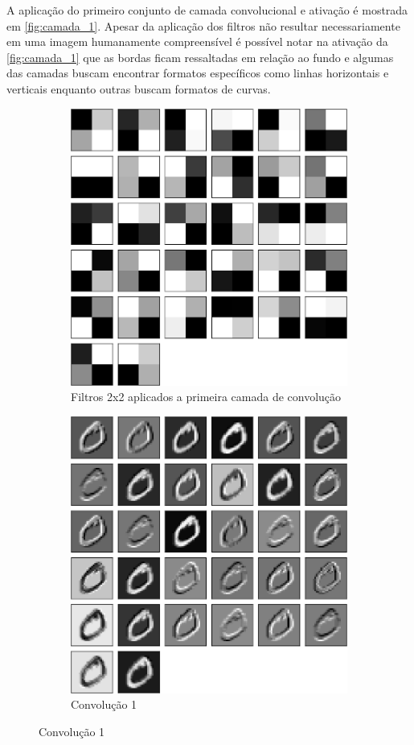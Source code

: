\documentclass[
	12pt,				%
	oneside,			%
	a4paper,			%
	english,			%
	french,				%
	spanish,			%
	brazil,				%
	]{abntex2}
\begin{document}
\par A aplicação do primeiro conjunto de camada convolucional e ativação é mostrada em \autoref{fig:camada_1}. Apesar da aplicação dos filtros não resultar necessariamente em uma imagem humanamente compreensível é possível notar na ativação da \ref{fig:camada_1} que as bordas ficam ressaltadas em relação ao fundo e algumas das camadas buscam encontrar formatos específicos como linhas horizontais e verticais enquanto outras buscam formatos de curvas. 

\begin{center}
\begin{figure}[H]
\centering
\begin{subfigure}{.8\textwidth}
\centering
\includegraphics[width=.6\linewidth]{images/fabio/resultados/network_3/filter_convolution2d_1}%
\caption{Filtros 2x2 aplicados a primeira camada de convolução}		
\label{fig:filtros2x2}	
\end{subfigure}%

\begin{subfigure}{.8\textwidth}
\centering
\includegraphics[width=.6\linewidth]{images/fabio/resultados/network_3/input_1_layer_convolution2d_1}
\caption{Convolução 1}
\end{subfigure}%


\end{figure}
\end{center}
\end{document}
